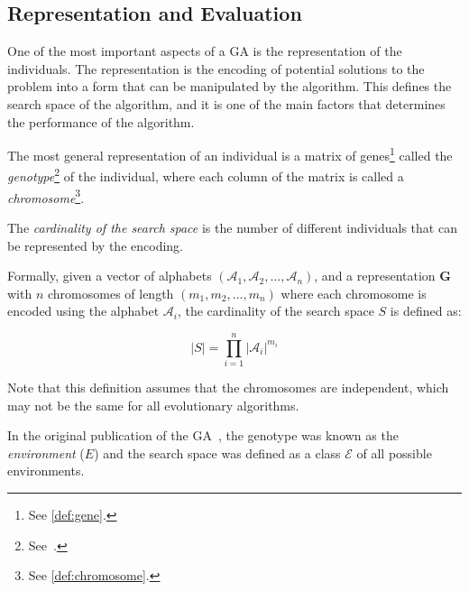 \subsection{Representation and Evaluation}
\label{ssec:genetic_algorithms:representation}
  One of the most important aspects of a GA is the representation of the individuals.
  The representation is the encoding of potential solutions to the problem into a form that can be
  manipulated by the algorithm.
  This defines the search space of the algorithm, and it is one of the main factors that
  determines the performance of the algorithm.

  The most general representation of an individual is a matrix of genes\footnote{
    See \vref{def:gene}.
  } called the \emph{genotype}\footnote{See~\autocite{wilhelmstotterJeneticsJavaGenetica}.} of the 
  individual, where each column of the matrix is called a \emph{chromosome}\footnote{
    See \vref{def:chromosome}.
  }.
  
  \begin{Definition}
  \label{def:cardinality_of_the_search_space}
    The \emph{cardinality of the search space} is the number of different individuals that 
    can be represented by the encoding.

    Formally, given a vector of alphabets \((\mathcal{A}_1, \mathcal{A}_2, \dots, \mathcal{A}_n)\), 
    and a representation \(\mathbf{G}\) with \(n\) chromosomes of length \((m_1, m_2, \dots, 
    m_n)\) where each chromosome is encoded using the alphabet \(\mathcal{A}_i\), the cardinality 
    of the search space \(S\) is defined as:
    
    \begin{equation}
      \label{eq:cardinality_of_the_search_space}
      |S| = \prod_{i=1}^n |\mathcal{A}_i|^{m_i}
    \end{equation}

    Note that this definition assumes that the chromosomes are independent, which may not be the 
    same for all evolutionary algorithms.
  \end{Definition}

  \begin{remark}
    In the original publication of the GA~\autocite{hollandAdaptationNaturalArtificial1992a}, the
    genotype was known as the \emph{environment} (\(E\)) and the search space was defined as a class
    \(\mathcal{E}\) of all possible environments.
  \end{remark}

